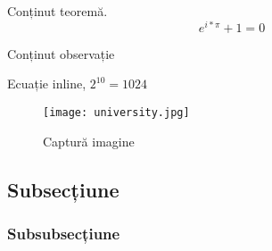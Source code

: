\begin{theorem}
	Conținut teoremă.
	\[
		e^{i * \pi} + 1 = 0
	\]
\end{theorem}

\begin{remark}
	Conținut observație
\end{remark}

Ecuație inline, $2^{10} = 1024 $

\begin{figure}[h]
	\begin{center}
			\texttt{[image: university.jpg]}
	\end{center}
	\caption{Captură imagine}
\end{figure}


\subsection{Subsecțiune}

\subsubsection{Subsubsecțiune}